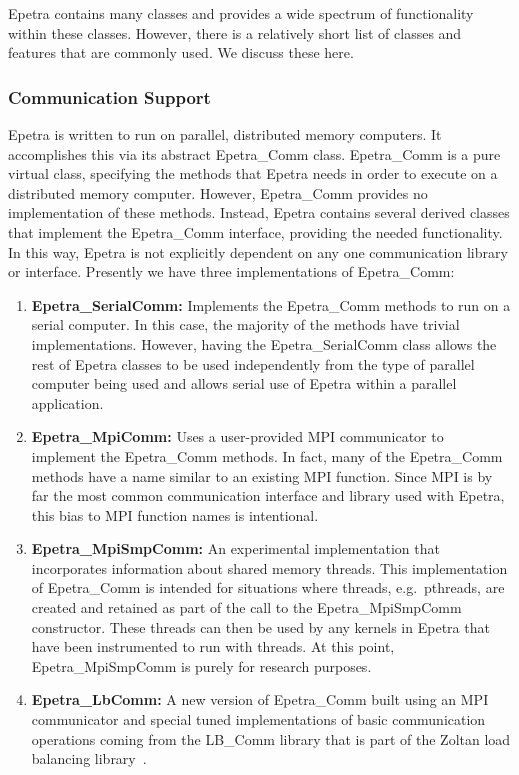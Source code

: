 \documentclass[12pt,relax]{EpetraUserGuide}
\newcommand{\comm}{Epetra\_Comm}
\newcommand{\serialcomm}{Epetra\_SerialComm}
\newcommand{\mpicomm}{Epetra\_MpiComm}
\newcommand{\mpismpcomm}{Epetra\_MpiSmpComm}
\newcommand{\lbcomm}{Epetra\_LbComm}
\begin{document}
Epetra contains many classes and provides a wide spectrum of
functionality within these classes.  However, there is a relatively
short list of classes and features that are commonly used.  We discuss
these here.

\subsubsection{Communication Support}
Epetra is written to run on parallel, distributed memory computers.  It accomplishes 
this via its abstract \comm{} class.  \comm{} is a pure virtual class,
specifying the methods that Epetra needs in order to execute on a
distributed memory computer.  However, \comm{} provides no
implementation of these methods.  Instead, Epetra contains
several derived classes that implement the \comm{} interface,
providing the needed functionality.  In this way, Epetra is not
explicitly dependent on any one communication library or interface.
Presently we have three implementations of \comm{}:
\begin{enumerate}
\item {\bf \serialcomm{}: } Implements the \comm{}
methods to run on a serial computer.  In this case, the majority of
the methods have trivial implementations.  However, having the
\serialcomm{} class allows the rest of Epetra classes to be used
independently from the type of parallel computer being used and allows
serial use of Epetra within a parallel application.
\item {\bf \mpicomm{}: } Uses a user-provided MPI
communicator to implement the \comm{} methods.  In fact, many of the
\comm{} methods have a name similar to an existing MPI function.
Since MPI is by far the most common communication interface and
library used with Epetra, this bias to MPI function names is
intentional.
\item {\bf \mpismpcomm{}:} An experimental implementation that
incorporates information about shared memory threads.  This
implementation of \comm{} is intended for situations where threads,
e.g.~pthreads, are created and retained as part of the call to the 
\mpismpcomm{} constructor.  These threads can then be used by any
kernels in Epetra that have been instrumented to run with threads.  At
this point, \mpismpcomm{} is purely for research purposes.
\item {\bf \lbcomm{}: } A new version of \comm{} built using an MPI
communicator and special tuned implementations of basic communication
operations coming from the LB\_Comm library that is part of the Zoltan
load balancing library~\cite{zoltan-ug}.
\end{enumerate}
\end{document}
